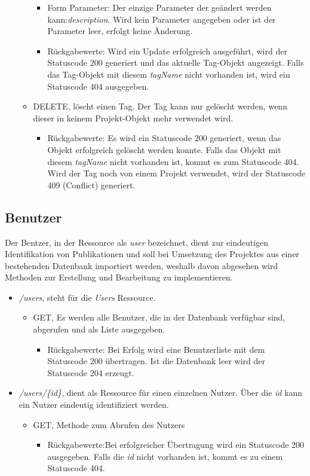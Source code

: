 \documentclass[12pt]{scrartcl}
\begin{document}
\begin{itemize}
\begin{itemize}
\begin{itemize}
			\item Form Parameter: Der einzige Parameter der geändert werden kann:\emph{description}. Wird kein Parameter angegeben oder ist der Parameter leer, erfolgt keine Änderung. 
			\item Rückgabewerte: Wird ein Update erfolgreich ausgeführt, wird der Statuscode 200 generiert und das aktuelle Tag-Objekt angezeigt. Falls das Tag-Objekt mit diesem \emph{tagName} nicht vorhanden ist, wird ein Statuscode 404 ausgegeben.  
		\end{itemize} 
		\item DELETE, löscht einen Tag. Der Tag kann nur gelöscht werden, wenn dieser in keinem Projekt-Objekt mehr verwendet wird.
		\begin{itemize}
			\item Rückgabewerte: Es wird ein Statuscode 200 generiert, wenn das Objekt erfolgreich gelöscht werden konnte. Falls das Objekt mit diesem \emph{tagName} nicht vorhanden ist, kommt es zum Statuscode 404. Wird der Tag noch von einem Projekt verwendet, wird der Statuscode 409 (Conflict) generiert.
		\end{itemize}
	\end{itemize} 	
\end{itemize}
\subsection{Benutzer}
Der Bentzer, in der Ressource als \emph{user} bezeichnet, dient zur eindeutigen Identifikation von Publikationen und soll bei Umsetzung des Projektes aus einer bestehenden Datenbank importiert werden, weshalb davon abgesehen wird Methoden zur Erstellung und Bearbeitung zu implementieren.
\begin{itemize}
	\item \emph{/users}, steht für die \emph{Users} Ressource. 
	\begin{itemize}
		\item GET, Es werden alle Benutzer, die in der Datenbank verfügbar sind, abgerufen und als Liste ausgegeben.
		\begin{itemize}
			\item Rückgabewerte: Bei Erfolg wird eine Benutzerliste mit dem Statuscode 200 übertragen. Ist die Datenbank leer wird der Statuscode 204 erzeugt.
		\end{itemize} 
	\end{itemize}
	\item \emph{ /users/\{id\}}, dient als Ressource für einen einzelnen Nutzer. Über die \emph{id} kann ein Nutzer eindeutig identifiziert werden. 
	\begin{itemize}
		\item GET, Methode zum Abrufen des Nutzers
		\begin{itemize}
			\item Rückgabewerte:Bei erfolgreicher Übertragung wird ein Statuscode 200 ausgegeben. Falls die \emph{id} nicht vorhanden ist, kommt es zu einem Statuscode 404.
		\end{itemize} 
	\end{itemize}
\end{itemize}
\end{document}
